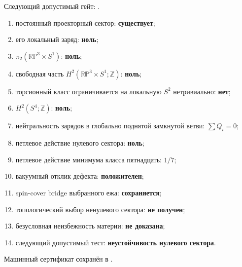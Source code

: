 Следующий допустимый гейт:
.

\begin{protocol}
\begin{enumerate}
 \item постоянный проекторный сектор: \textbf{существует};
 \item его локальный заряд: \textbf{ноль};
 \item $\pi_2(\mathbb{RP}^3\times S^1)$: \textbf{ноль};
 \item свободная часть $H^2(\mathbb{RP}^3\times S^1;\mathbb Z)$:
 \textbf{ноль};
 \item торсионный класс ограничивается на локальную $S^2$ нетривиально:
 \textbf{нет};
 \item $H^2(S^4;\mathbb Z)$: \textbf{ноль};
 \item нейтральность зарядов в глобально поднятой замкнутой ветви:
 \textbf{$\sum Q_i=0$};
 \item петлевое действие нулевого сектора: \textbf{ноль};
 \item петлевое действие минимума класса пятнадцать: \textbf{$1/7$};
 \item вакуумный отклик дефекта: \textbf{положителен};
 \item spin-cover bridge выбранного ежа: \textbf{сохраняется};
 \item топологический выбор ненулевого сектора: \textbf{не получен};
 \item безусловная неизбежность материи: \textbf{не доказана};
 \item следующий допустимый тест: \textbf{неустойчивость нулевого сектора}.
\end{enumerate}
\end{protocol}

Машинный сертификат сохранён в
.